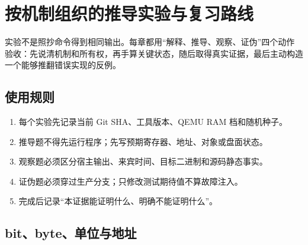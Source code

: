 \chapter*{按机制组织的推导实验与复习路线}

实验不是照抄命令得到相同输出。每章都用“解释、推导、观察、证伪”四个动作
验收：先说清机制和所有权，再手算关键状态，随后取得真实证据，最后主动构造
一个能够推翻错误实现的反例。

\section*{使用规则}

\begin{enumerate}[leftmargin=2.2em]
  \item 每个实验先记录当前 Git SHA、工具版本、QEMU RAM 档和随机种子。
  \item 推导题不得先运行程序；先写预期寄存器、地址、对象或盘面状态。
  \item 观察题必须区分宿主输出、来宾时间、目标二进制和源码静态事实。
  \item 证伪题必须穿过生产分支；只修改测试期待值不算故障注入。
  \item 完成后记录“本证据能证明什么、明确不能证明什么”。
\end{enumerate}

\section*{bit、byte、单位与地址}

